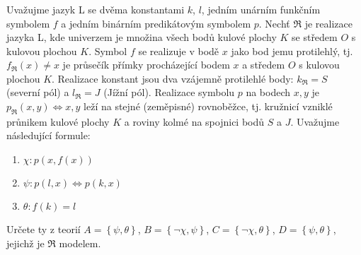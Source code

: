 \subsubsection{}
Uvažujme jazyk L se dvěma konstantami $k$, $l$, jedním unárním funkčním symbolem
$f$ a jedním binárním predikátovým symbolem $p$. Nechť $\Re$ je realizace jazyka
L, kde univerzem je množina všech bodů kulové plochy $K$ se středem $O$ s
kulovou plochou $K$. Symbol $f$ se realizuje v bodě $x$ jako bod jemu
protilehlý, tj. $f_{\Re}(x) \neq x$ je průsečík přímky procházející bodem  $x$ a
středem $O$ s kulovou plochou $K$. Realizace konstant jsou dva vzájemně
protilehlé body: $k_{\Re} = S$ (severní pól) a $l_{\Re} = J$ (Jížní pól).
Realizace symbolu $p$ na bodech $x,y$ je $p_{\Re}(x,y) \Leftrightarrow x,y$
leží na stejné (zeměpisné) rovnoběžce, tj. kružnicí vzniklé průnikem kulové
plochy $K$ a roviny kolmé na spojnici bodů $S$ a $J$. Uvažujme následující
formule:
\begin{enumerate}[(1)]
  \item $\chi: p(x, f(x))$
  \item $\psi: p(l,x) \Leftrightarrow p(k,x)$
  \item $\theta: f(k) = l$
\end{enumerate}
Určete ty z teorií $A=\left \{ \psi, \theta \right \}$, $B=\left \{
\neg\chi,\psi \right \}$, $C=\left \{ \neg\chi, \theta \right \}$, $D= \left \{
\psi, \theta \right \}$, jejichž je $\Re$ modelem.

